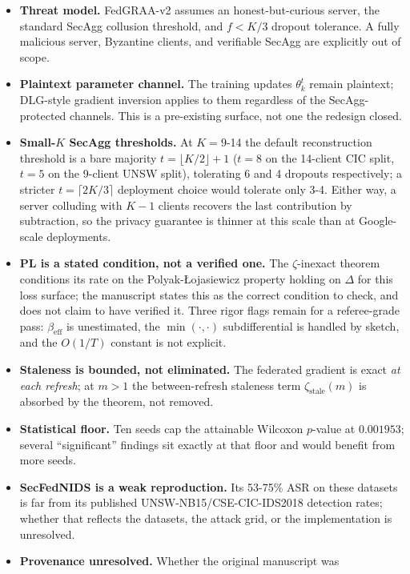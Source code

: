\documentclass[11pt,a4paper]{report}
\begin{document}
\begin{itemize}
  \item \textbf{Threat model.} FedGRAA-v2 assumes an honest-but-curious
  server, the standard SecAgg collusion threshold, and $f < K/3$ dropout
  tolerance. A fully malicious server, Byzantine clients, and verifiable
  SecAgg are explicitly out of scope.
  \item \textbf{Plaintext parameter channel.} The training updates
  $\theta_k^t$ remain plaintext; DLG-style gradient inversion
  \cite{zhu2019dlg} applies to them regardless of the SecAgg-protected
  channels. This is a pre-existing surface, not one the redesign closed.
  \item \textbf{Small-$K$ SecAgg thresholds.} At $K = 9$-14 the default
  reconstruction threshold is a bare majority $t = \lfloor K/2 \rfloor + 1$
  ($t = 8$ on the 14-client CIC split, $t = 5$ on the 9-client UNSW split),
  tolerating 6 and 4 dropouts respectively; a stricter
  $t = \lceil 2K/3 \rceil$ deployment choice would tolerate only 3-4. Either
  way, a server colluding with $K{-}1$ clients recovers the last
  contribution by subtraction, so the privacy guarantee is thinner at this
  scale than at Google-scale deployments.
  \item \textbf{PL is a stated condition, not a verified one.} The
  $\zeta$-inexact theorem conditions its rate on the Polyak-{\L}ojasiewicz
  property holding on $\Delta$ for this loss surface; the manuscript states
  this as the correct condition to check, and does not claim to have
  verified it. Three rigor flags remain for a referee-grade pass:
  $\beta_{\mathrm{eff}}$ is unestimated, the $\min(\cdot,\cdot)$
  subdifferential is handled by sketch, and the $O(1/T)$ constant is not
  explicit.
  \item \textbf{Staleness is bounded, not eliminated.} The federated
  gradient is exact \emph{at each refresh}; at $m > 1$ the between-refresh
  staleness term $\zeta_{\mathrm{stale}}(m)$ is absorbed by the theorem,
  not removed.
  \item \textbf{Statistical floor.} Ten seeds cap the attainable Wilcoxon
  $p$-value at $0.001953$; several ``significant'' findings sit exactly at
  that floor and would benefit from more seeds.
  \item \textbf{SecFedNIDS is a weak reproduction.} Its 53-75\% ASR on
  these datasets is far from its published UNSW-NB15/CSE-CIC-IDS2018
  detection rates; whether that reflects the datasets, the attack grid, or
  the implementation is unresolved.
  \item \textbf{Provenance unresolved.} Whether the original manuscript was

\end{itemize}
\end{document}
